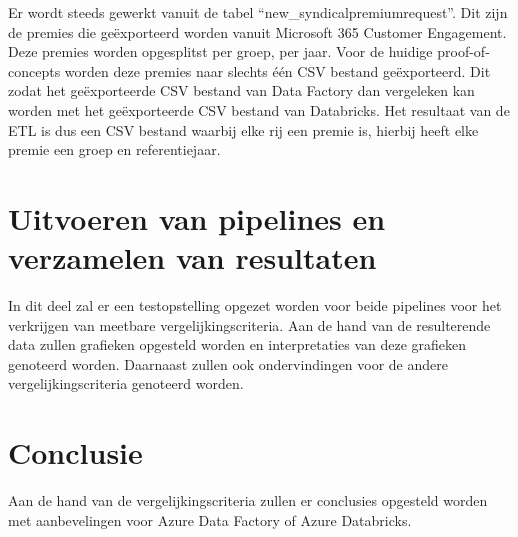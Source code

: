Er wordt steeds gewerkt vanuit de tabel ``new\_syndicalpremiumrequest''. Dit zijn de premies die geëxporteerd worden vanuit Microsoft 365 Customer Engagement. Deze premies worden opgesplitst per groep, per jaar. Voor de huidige proof-of-concepts worden deze premies naar slechts één CSV bestand geëxporteerd. Dit zodat het geëxporteerde CSV bestand van Data Factory dan vergeleken kan worden met het geëxporteerde CSV bestand van Databricks. Het resultaat van de ETL is dus een CSV bestand waarbij elke rij een premie is, hierbij heeft elke premie een groep en referentiejaar.

\section{Uitvoeren van pipelines en verzamelen van resultaten}

In dit deel zal er een testopstelling opgezet worden voor beide pipelines voor het verkrijgen van meetbare vergelijkingscriteria. Aan de hand van de resulterende data zullen grafieken opgesteld worden en interpretaties van deze grafieken genoteerd worden. Daarnaast zullen ook ondervindingen voor de andere vergelijkingscriteria genoteerd worden.

\section{Conclusie}

Aan de hand van de vergelijkingscriteria zullen er conclusies opgesteld worden met aanbevelingen voor Azure Data Factory of Azure Databricks.


